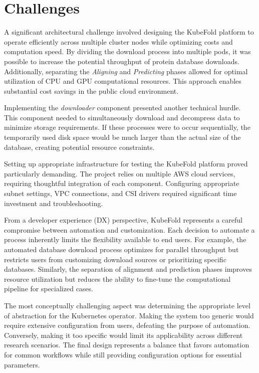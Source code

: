 \section{Challenges}

A significant architectural challenge involved designing the KubeFold platform to operate efficiently across multiple cluster nodes while optimizing costs and computation speed.
By dividing the download process into multiple pods, it was possible to increase the potential throughput of protein database downloads.
Additionally, separating the \textit{Aligning} and \textit{Predicting} phases allowed for optimal utilization of CPU and GPU computational resources.
This approach enables substantial cost savings in the public cloud environment.

Implementing the \textit{downloader} component presented another technical hurdle.
This component needed to simultaneously download and decompress data to minimize storage requirements.
If these processes were to occur sequentially, the temporarily used disk space would be much larger than the actual size of the database, creating potential resource constraints.

Setting up appropriate infrastructure for testing the KubeFold platform proved particularly demanding.
The project relies on multiple AWS cloud services, requiring thoughtful integration of each component.
Configuring appropriate subnet settings, VPC connections, and CSI drivers required significant time investment and troubleshooting.

From a developer experience (DX) perspective, KubeFold represents a careful compromise between automation and customization. Each decision to automate a process inherently limits the flexibility available to end users. For example, the automated database download process optimizes for parallel throughput but restricts users from customizing download sources or prioritizing specific databases. Similarly, the separation of alignment and prediction phases improves resource utilization but reduces the ability to fine-tune the computational pipeline for specialized cases.

The most conceptually challenging aspect was determining the appropriate level of abstraction for the Kubernetes operator. Making the system too generic would require extensive configuration from users, defeating the purpose of automation. Conversely, making it too specific would limit its applicability across different research scenarios. The final design represents a balance that favors automation for common workflows while still providing configuration options for essential parameters.

